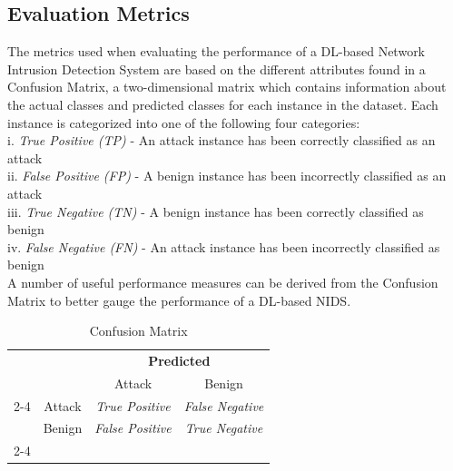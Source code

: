 \documentclass[conference]{IEEEtran}
\begin{document}
\subsection{Evaluation Metrics}
The metrics used when evaluating the performance of a DL-based Network Intrusion Detection System are based on the different attributes found in a Confusion Matrix, a two-dimensional matrix which contains information about the actual classes and predicted classes for each instance in the dataset. Each instance is categorized into one of the following four categories:\\

\noindent i. \emph{True Positive (TP)} - An attack instance has been correctly classified as an attack\\ 
ii. \emph{False Positive (FP)} - A benign instance has been incorrectly classified as an attack\\
iii. \emph{True Negative (TN)} - A benign instance has been correctly classified as benign \\
iv. \emph{False Negative (FN)} - An attack instance has been incorrectly classified as benign \\

\noindent A number of useful performance measures can be derived from the Confusion Matrix to better gauge the performance of a DL-based NIDS.

\begin{table}[htbp]
\caption{Confusion Matrix}
    \centering
    
\begin{tabular}{cc|cc}
\multicolumn{2}{c}{}
            &   \multicolumn{2}{c}{\textbf{Predicted}} \\
            
    &       &   Attack &   Benign              \\ 
    \cline{2-4}
\multirow{\rotatebox[origin=c]{90}{\textbf{Actual}}}
    & Attack   & \emph{True Positive}   & \emph{False Negative}                 \\
    & Benign    & \emph{False Positive}    & \emph{True Negative}                \\ 
    \cline{2-4}
\end{tabular}

    
    \label{tab:my_label}
\end{table}
\\
\end{document}
